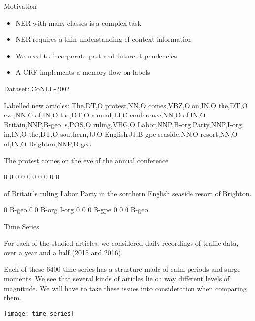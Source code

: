 \documentclass[final]{beamer}
\newlength{\onecolwid}
\begin{document}
\begin{frame}[t]
\begin{columns}[t]
\begin{column}{\onecolwid}
\begin{block}{Motivation}
    \begin{itemize}
      \item NER with many classes is a complex task
      \item NER requires a thin understanding of context information
      \item We need to incorporate past and future dependencies
      \item A CRF implements a memory flow on labels
    \end{itemize}

\end{block}

\begin{block}{Dataset: CoNLL-2002}

Labelled new articles:
The,DT,O
protest,NN,O
comes,VBZ,O
on,IN,O
the,DT,O
eve,NN,O
of,IN,O
the,DT,O
annual,JJ,O
conference,NN,O
of,IN,O
Britain,NNP,B-geo
's,POS,O
ruling,VBG,O
Labor,NNP,B-org
Party,NNP,I-org
in,IN,O
the,DT,O
southern,JJ,O
English,JJ,B-gpe
seaside,NN,O
resort,NN,O
of,IN,O
Brighton,NNP,B-geo

The protest comes on the eve of the annual conference

0 0 0 0 0 0 0 0 0 0 

of Britain's ruling Labor Party in the southern English seaside resort of Brighton.

0 B-geo 0 0 B-org I-org 0 0 0 B-gpe 0 0 0 B-geo
\end{block}

\begin{block}{Time Series}

For each of the studied articles, we considered daily recordings of traffic data, over a year and a half (2015 and 2016).

\vspace{5mm}

Each of these 6400 time series has a structure made of calm periods and surge moments. We see that several kinds of articles lie on way different levels of magnitude. We will have to take these issues into consideration when comparing them.

\begin{center}
  \texttt{[image: time\_series]}
\end{center}

\end{block}



\end{column}
\end{columns}
\end{frame}
\end{document}
